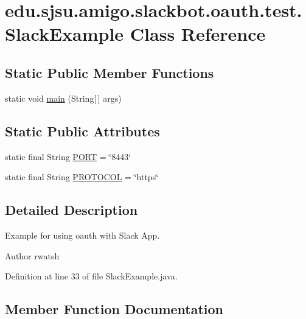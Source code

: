 \hypertarget{classedu_1_1sjsu_1_1amigo_1_1slackbot_1_1oauth_1_1test_1_1_slack_example}{}\section{edu.\+sjsu.\+amigo.\+slackbot.\+oauth.\+test.\+Slack\+Example Class Reference}
\label{classedu_1_1sjsu_1_1amigo_1_1slackbot_1_1oauth_1_1test_1_1_slack_example}
\subsection*{Static Public Member Functions}
\begin{DoxyCompactItemize}
\item 
static void \hyperlink{classedu_1_1sjsu_1_1amigo_1_1slackbot_1_1oauth_1_1test_1_1_slack_example_a5b6d04d6f5403e632372794b57d0fc7f}{main} (String\mbox{[}$\,$\mbox{]} args)
\end{DoxyCompactItemize}
\subsection*{Static Public Attributes}
\begin{DoxyCompactItemize}
\item 
static final String \hyperlink{classedu_1_1sjsu_1_1amigo_1_1slackbot_1_1oauth_1_1test_1_1_slack_example_a4823987b265245bca3826c61d0c069cc}{P\+O\+RT} = \char`\"{}8443\char`\"{}
\item 
static final String \hyperlink{classedu_1_1sjsu_1_1amigo_1_1slackbot_1_1oauth_1_1test_1_1_slack_example_a15f7b1f739982e0fe7a0b2343641de4f}{P\+R\+O\+T\+O\+C\+OL} = \char`\"{}https\char`\"{}
\end{DoxyCompactItemize}


\subsection{Detailed Description}
Example for using oauth with Slack App.

\begin{DoxyAuthor}{Author}
rwatsh 
\end{DoxyAuthor}


Definition at line 33 of file Slack\+Example.\+java.



\subsection{Member Function Documentation}
\mbox{\label{classedu_1_1sjsu_1_1amigo_1_1slackbot_1_1oauth_1_1test_1_1_slack_example_a5b6d04d6f5403e632372794b57d0fc7f}} 
